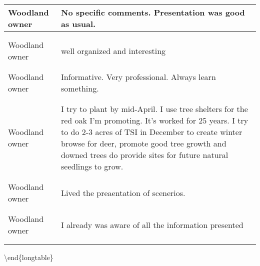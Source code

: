 \documentclass[
]{article}
\begin{document}
\begin{longtable}[t]{>{\raggedright\arraybackslash}p{5cm}>{\raggedright\arraybackslash}p{10cm}}
\midrule
Woodland owner & No specific comments. Presentation was good as usual.\\
\midrule\\
\cellcolor{gray!10}{Woodland owner} & \cellcolor{gray!10}{Enjoyed the pace and the content presented. Struggled a little bit with the graphs until they were explained. There was a lot of data in those graphs.}\\
\midrule
Woodland owner & well organized and interesting\\
\midrule\\
\addlinespace
\cellcolor{gray!10}{Woodland owner} & \cellcolor{gray!10}{charming}\\
\midrule
Woodland owner & Informative. Very professional. Always learn something.\\
\midrule\\
\cellcolor{gray!10}{Woodland owner} & \cellcolor{gray!10}{thanks for the knowledge you share, this adds to my arsenal of tools or just gives me confidence i'm going down the right path}\\
\midrule
Woodland owner & I try to plant by mid-April.  I use tree shelters for the red oak I'm promoting.  It's worked for 25 years.  I try to do 2-3 acres of TSI in December to create winter browse for deer, promote good tree growth and downed trees do provide sites for future natural  seedlings to grow.\\
\midrule\\
\cellcolor{gray!10}{Woodland owner} & \cellcolor{gray!10}{PETER IS VERY KNOWLEDGABLE}\\
\midrule
\addlinespace
Woodland owner & Lived the preaentation of scenerios.\\
\midrule\\
\cellcolor{gray!10}{Woodland owner} & \cellcolor{gray!10}{Peter is well informed. He kept the presentation flowing and interesting and}\\
\midrule
Woodland owner & I already was aware of all the information presented\\
\midrule\\
\cellcolor{gray!10}{Woodland owner} & \cellcolor{gray!10}{The information provided was relevant to my goals of sustainable forestry/ wildlife/ habitat enhancement and future grazier.as a woodlot}\\
\midrule
\bottomrule
\end{longtable}

\textbackslash end\{longtable\}

\newpage
\end{document}
